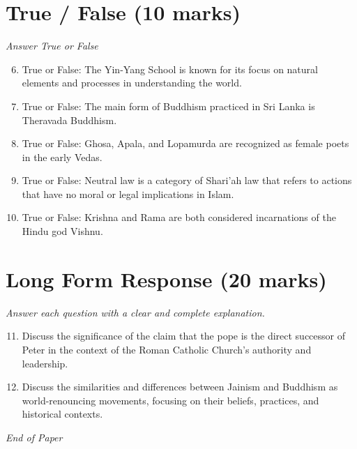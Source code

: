 \documentclass[12pt]{article}
\begin{document}
\section*{True / False (10 marks)}
\textit{Answer True or False}
\begin{enumerate}[label=\arabic*.]
\setcounter{enumi}{5}
\item True or False: The Yin-Yang School is known for its focus on natural elements and processes in understanding the world.
\item True or False: The main form of Buddhism practiced in Sri Lanka is Theravada Buddhism.
\item True or False: Ghosa, Apala, and Lopamurda are recognized as female poets in the early Vedas.
\item True or False: Neutral law is a category of Shari'ah law that refers to actions that have no moral or legal implications in Islam.
\item True or False: Krishna and Rama are both considered incarnations of the Hindu god Vishnu.
\end{enumerate}

\section*{Long Form Response (20 marks)}
\textit{Answer each question with a clear and complete explanation.}
\begin{enumerate}[label=\arabic*.]
\setcounter{enumi}{10}
\item Discuss the significance of the claim that the pope is the direct successor of Peter in the context of the Roman Catholic Church's authority and leadership.
\item Discuss the similarities and differences between Jainism and Buddhism as world-renouncing movements, focusing on their beliefs, practices, and historical contexts.
\end{enumerate}

\vfill
\noindent\textit{End of Paper}
\end{document}
